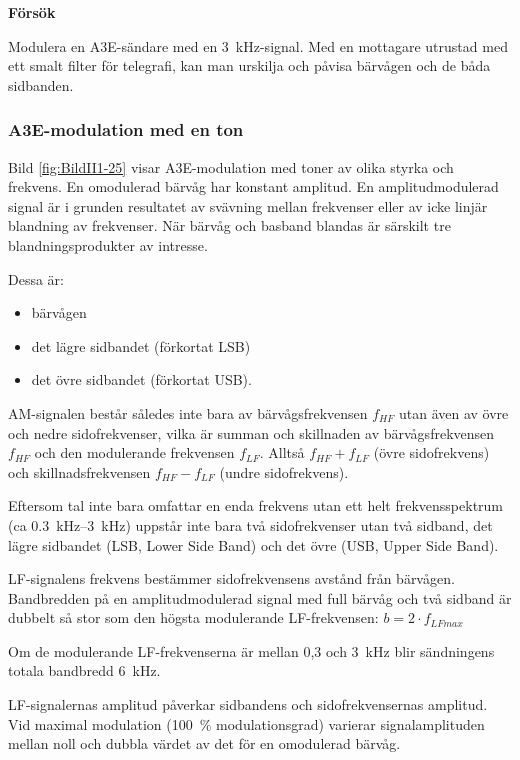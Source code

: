 \textbf{Försök}

Modulera en A3E-sändare med en \SI{3}{\kilo\hertz}-signal.
Med en mottagare utrustad med ett smalt filter för telegrafi, kan man urskilja
och påvisa bärvågen och de båda sidbanden.

\subsubsection{A3E-modulation med en ton}


Bild \ref{fig:BildII1-25} visar A3E-modulation med toner av olika styrka och
frekvens.
En omodulerad bärvåg har konstant amplitud.
En amplitudmodulerad signal är i grunden resultatet av svävning mellan
frekvenser eller av icke linjär blandning av frekvenser.
När bärvåg och basband blandas är särskilt tre blandningsprodukter av
intresse.

Dessa är:
\begin{itemize}
\item bärvågen
\item det lägre sidbandet (förkortat LSB)
\item det övre sidbandet (förkortat USB).
\end{itemize}

AM-signalen består således inte bara av bärvågsfrekvensen \(f_{HF}\) utan även
av övre och nedre sidofrekvenser, vilka är summan och skillnaden av
bärvågsfrekvensen \(f_{HF}\) och den modulerande frekvensen \(f_{LF}\).
Alltså \(f_{HF} + f_{LF}\) (övre sidofrekvens) och skillnadsfrekvensen
\(f_{HF} - f_{LF}\) (undre sidofrekvens).

Eftersom tal inte bara omfattar en enda frekvens utan ett helt frekvensspektrum
(ca \SIrange{0,3}{3}{\kilo\hertz}) uppstår inte bara två sidofrekvenser utan två
sidband, det lägre sidbandet (LSB, Lower Side Band) och det övre (USB, Upper
Side Band).

LF-signalens frekvens bestämmer sidofrekvensens avstånd från bärvågen.
Bandbredden på en amplitudmodulerad signal med full bärvåg och två sidband är
dubbelt så stor som den högsta modulerande LF-frekvensen:
\(b= 2 \cdot f_{LFmax}\)

Om de modulerande LF-frekvenserna är mellan 0,3 och \SI{3}{\kilo\hertz} blir
sändningens totala bandbredd \SI{6}{\kilo\hertz}.

LF-signalernas amplitud påverkar sidbandens och sidofrekvensernas amplitud.
Vid maximal modulation (100~\% modulationsgrad) varierar signalamplituden mellan
noll och dubbla värdet av det för en omodulerad bärvåg.

